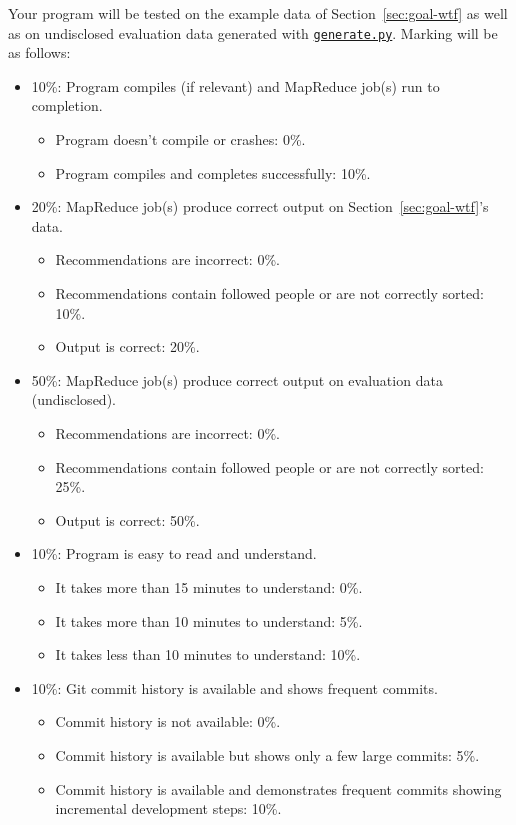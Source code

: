 \documentclass[11pt]{article}
\begin{document}
Your program will be tested on the example data of
Section~\ref{sec:goal-wtf} as well as on undisclosed evaluation
data generated with \href{https://github.com/glatard/big-data-analytics-course/raw/master/labs/wtf/generate.py}{\texttt{generate.py}}. Marking will be as follows:
\begin{itemize}
\item 10\%: Program compiles (if relevant) and MapReduce job(s) run to completion.
  \begin{itemize}
  \item Program doesn't compile or crashes: 0\%.
  \item Program compiles and completes successfully: 10\%.
  \end{itemize}
\item 20\%: MapReduce job(s) produce correct output on Section~\ref{sec:goal-wtf}'s data.
  \begin{itemize}
  \item Recommendations are incorrect: 0\%.
  \item Recommendations contain followed people
    or are not correctly sorted: 10\%.
  \item Output is correct: 20\%.
  \end{itemize}
\item 50\%: MapReduce job(s) produce correct output on evaluation data (undisclosed).
  \begin{itemize}
  \item Recommendations are incorrect: 0\%.
  \item Recommendations contain followed people
    or are not correctly sorted: 25\%.
  \item Output is correct: 50\%.
  \end{itemize}
\item 10\%: Program is easy to read and understand.
  \begin{itemize}
  \item It takes more than 15 minutes to understand: 0\%.
  \item It takes more than 10 minutes to understand: 5\%.
  \item It takes less than 10 minutes to understand: 10\%.
  \end{itemize}
\item 10\%: Git commit history is available and shows frequent commits.
  \begin{itemize}
  \item Commit history is not available: 0\%.
  \item Commit history is available but shows only a few large commits: 5\%.
  \item Commit history is available and demonstrates frequent commits
    showing incremental development steps: 10\%.
  \end{itemize}
\end{itemize}
\end{document}
